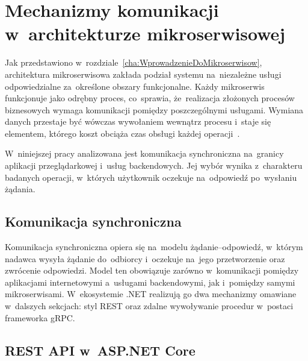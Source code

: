 \cleardoublepage

\chapter{Mechanizmy komunikacji w~architekturze mikroserwisowej}

\label{cha:MechanizmyKomunikacji}

Jak przedstawiono w~rozdziale~\ref{cha:WprowadzenieDoMikroserwisow}, architektura mikroserwisowa zakłada podział systemu na~niezależne usługi odpowiedzialne za~określone obszary funkcjonalne. Każdy mikroserwis funkcjonuje jako odrębny proces, co~sprawia, że~realizacja złożonych procesów biznesowych wymaga komunikacji pomiędzy poszczególnymi usługami. Wymiana danych przestaje być wówczas wywołaniem wewnątrz procesu i~staje się elementem, którego koszt obciąża czas obsługi każdej operacji~\cite{bib:Richardson2018}.

W~niniejszej pracy analizowana jest komunikacja synchroniczna na~granicy aplikacji przeglądarkowej i~usług backendowych. Jej wybór wynika z~charakteru badanych operacji, w~których użytkownik oczekuje na~odpowiedź po~wysłaniu żądania.


\section{Komunikacja synchroniczna}
\label{sec:KomunikacjaSynchroniczna}


Komunikacja synchroniczna opiera się na~modelu żądanie--odpowiedź, w~którym nadawca wysyła żądanie do~odbiorcy i~oczekuje na~jego przetworzenie oraz zwrócenie odpowiedzi. Model ten obowiązuje zarówno w~komunikacji pomiędzy aplikacjami internetowymi a~usługami backendowymi, jak i~pomiędzy samymi mikroserwisami.
W~ekosystemie .NET realizują go dwa mechanizmy omawiane w~dalszych sekcjach: styl REST oraz zdalne wywoływanie procedur w~postaci frameworka gRPC.


\section{REST API w~ASP.NET Core}
\label{sec:RESTAPI}

